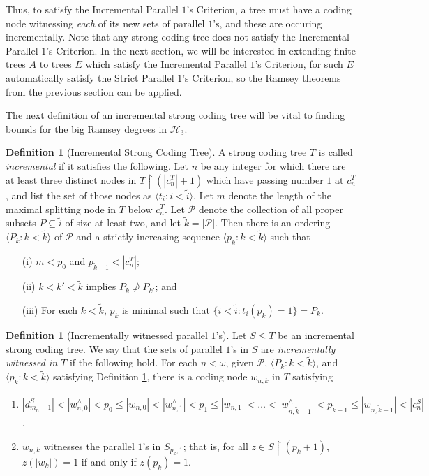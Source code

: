 \documentclass{amsart}
\theoremstyle{remark}
\theoremstyle{definition}
\newtheorem{defn}[thm]{Definition}
\theoremstyle{remark}
\newcommand{\om}{\omega}
\newcommand{\sse}{\subseteq}
\newcommand{\contains}{\supseteq}
\newcommand{\re}{\restriction}
\newcommand{\lgl}{\langle}
\newcommand{\rgl}{\rangle}
\newcommand{\SPOC}{Strict Parallel $1$'s Criterion}
\newcommand{\IPOC}{Incremental Parallel $1$'s Criterion}
\begin{document}
Thus, to satisfy the \IPOC, a tree must have a coding node witnessing {\em each} of its new sets of parallel $1$'s,  and these are occuring incrementally.
Note that any strong coding tree does not satisfy the \IPOC.
In the next section,
we will be  interested in extending  finite trees  $A$
to trees $E$ which
 satisfy the \IPOC,
for such $E$ automatically satisfy the \SPOC, so the Ramsey theorems from the previous section can be applied.


The next definition of an incremental strong coding tree will be vital to finding bounds for the big Ramsey degrees in $\mathcal{H}_3$.




\begin{defn}[Incremental Strong Coding Tree]\label{defn.incrementalsct}
A strong coding tree $T$ is called {\em incremental}
if  it satisfies the following.
Let  $n$ be any integer  for which there are at least three distinct nodes  in $T\re (|c^T_n|+1)$ which have passing number $1$ at $c^T_n$, and
list
the set of those nodes as $\lgl t_i: i<\tilde{i}\rgl$.
Let $m$ denote the  length of the maximal splitting node in $T$ below $c^T_n$.
Let $\mathcal{P}$ denote the collection of all proper subsets  $P\sse \tilde{i}$ of size at least two, and
let $\tilde{k}=|\mathcal{P}|$.
Then there is an ordering $\lgl P_k:k<\tilde{k}\rgl$
of $\mathcal{P}$
and
 a strictly increasing sequence $\lgl p_k:k<\tilde{k}\rgl$ such that
\begin{enumerate}
\item[(i)]
$m<p_0$ and $p_{\tilde{k}-1}<|c_n^T|$;
\item[(ii)]
$k<k'<\tilde{k}$ implies $P_k\not\contains P_{k'}$;
and
\item[(iii)]
For each $k<\tilde{k}$,
$p_k$ is minimal  such that $\{i<\tilde{i}:t_i(p_k)=1\}=P_k$.
\end{enumerate}
\end{defn}









\begin{defn}[Incrementally witnessed  parallel $1$'s]\label{defn.incremental}
Let $S\le T$  be an incremental strong coding tree.
We say that  the sets of  parallel $1$'s  in $S$  are  {\em incrementally witnessed in $T$}
if the following hold.
For each $n<\om$,
given $\mathcal{P}$, $\lgl P_k:k<\tilde{k}\rgl$, and
$\lgl p_k:k<\tilde{k}\rgl$ satisfying Definition \ref{defn.incrementalsct},
there is a coding node $w_{n,k}$ in $T$  satisfying
\begin{enumerate}
\item
$|d^S_{m_n-1}|<|w_{n,0}^{\wedge}|<p_0\le |w_{n,0}|<|w_{n,1}^{\wedge}|<p_1\le |w_{n,1}|<\dots  <|w_{n,\tilde{k}-1}^{\wedge}|<p_{\tilde{k}-1}\le|w_{n,\tilde{k}-1}|<|c^S_n|$.
\item
$w_{n,k}$ witnesses the parallel $1$'s in $S_{p_k,1}$;
that is,
for all $z\in S\re (p_k+1)$,
$z(|w_k|)=1$ if and only if $z(p_k)=1$.
\end{enumerate}
\end{defn}
\end{document}
